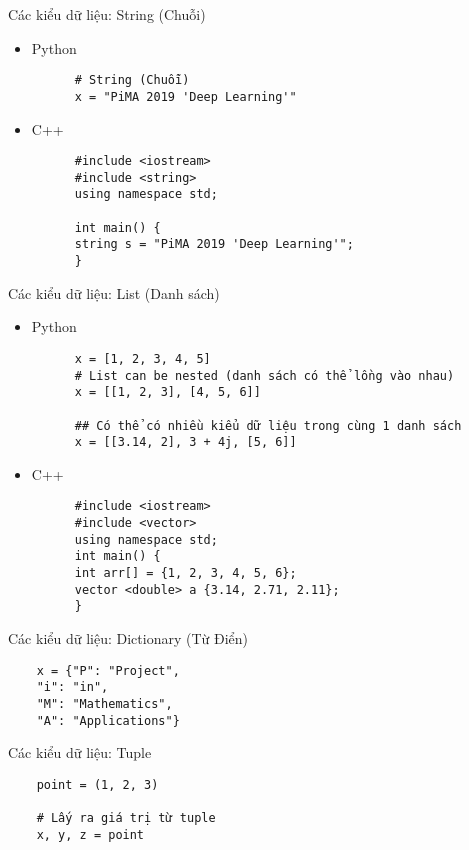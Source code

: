\documentclass[10pt]{beamer}
\begin{document}
\begin{frame}[fragile]{Các kiểu dữ liệu: String (Chuỗi)}
  \begin{itemize}
    \item Python
    \begin{verbatim}
      # String (Chuỗi)
      x = "PiMA 2019 'Deep Learning'"
    \end{verbatim}

    \item C++
    \begin{verbatim}
      #include <iostream>
      #include <string>
      using namespace std;

      int main() {
      string s = "PiMA 2019 'Deep Learning'";
      }
    \end{verbatim}
  \end{itemize}

\end{frame}


\begin{frame}[fragile]{Các kiểu dữ liệu: List (Danh sách)}

  \begin{itemize}
    \item Python
    \begin{verbatim}
      x = [1, 2, 3, 4, 5]
      # List can be nested (danh sách có thể lồng vào nhau)
      x = [[1, 2, 3], [4, 5, 6]]

      ## Có thể có nhiều kiểu dữ liệu trong cùng 1 danh sách
      x = [[3.14, 2], 3 + 4j, [5, 6]]
    \end{verbatim}
    \item C++
    \begin{verbatim}
      #include <iostream>
      #include <vector>
      using namespace std;
      int main() {
      int arr[] = {1, 2, 3, 4, 5, 6};
      vector <double> a {3.14, 2.71, 2.11};
      }
    \end{verbatim}
  \end{itemize}
\end{frame}

\begin{frame}[fragile]{Các kiểu dữ liệu: Dictionary (Từ Điển)}
  \begin{verbatim}
    x = {"P": "Project",
    "i": "in",
    "M": "Mathematics",
    "A": "Applications"}
  \end{verbatim}
\end{frame}

\begin{frame}[fragile]{Các kiểu dữ liệu: Tuple}
  \begin{verbatim}
    point = (1, 2, 3)

    # Lấy ra giá trị từ tuple
    x, y, z = point
  \end{verbatim}


\end{frame}
\end{document}
